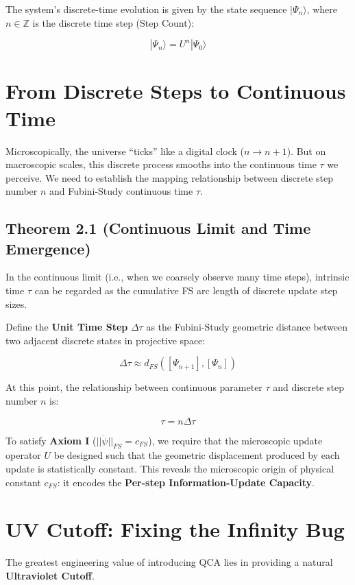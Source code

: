 The system's discrete-time evolution is given by the state sequence \textbf{$|\Psi_n\rangle$}, where \textbf{$n \in \mathbb{Z}$} is the discrete time step (Step Count):

$$|\Psi_n\rangle = U^n |\Psi_0\rangle$$

\section{From Discrete Steps to Continuous Time}

Microscopically, the universe ``ticks'' like a digital clock (\textbf{$n \to n+1$}). But on macroscopic scales, this discrete process smooths into the continuous time \textbf{$\tau$} we perceive. We need to establish the mapping relationship between discrete step number \textbf{$n$} and Fubini-Study continuous time \textbf{$\tau$}.

\subsection{Theorem 2.1 (Continuous Limit and Time Emergence)}

In the continuous limit (i.e., when we coarsely observe many time steps), intrinsic time \textbf{$\tau$} can be regarded as the cumulative FS arc length of discrete update step sizes.

Define the \textbf{Unit Time Step} \textbf{$\Delta \tau$} as the Fubini-Study geometric distance between two adjacent discrete states in projective space:

$$\Delta \tau \approx d_{FS}([\Psi_{n+1}], [\Psi_n])$$

At this point, the relationship between continuous parameter \textbf{$\tau$} and discrete step number \textbf{$n$} is:

$$\tau = n \Delta \tau$$

To satisfy \textbf{Axiom I} (\textbf{$||\dot{\psi}||_{FS} = c_{FS}$}), we require that the microscopic update operator \textbf{$U$} be designed such that the geometric displacement produced by each update is statistically constant. This reveals the microscopic origin of physical constant \textbf{$c_{FS}$}: it encodes the \textbf{Per-step Information-Update Capacity}.

\section{UV Cutoff: Fixing the Infinity Bug}

The greatest engineering value of introducing QCA lies in providing a natural \textbf{Ultraviolet Cutoff}.

